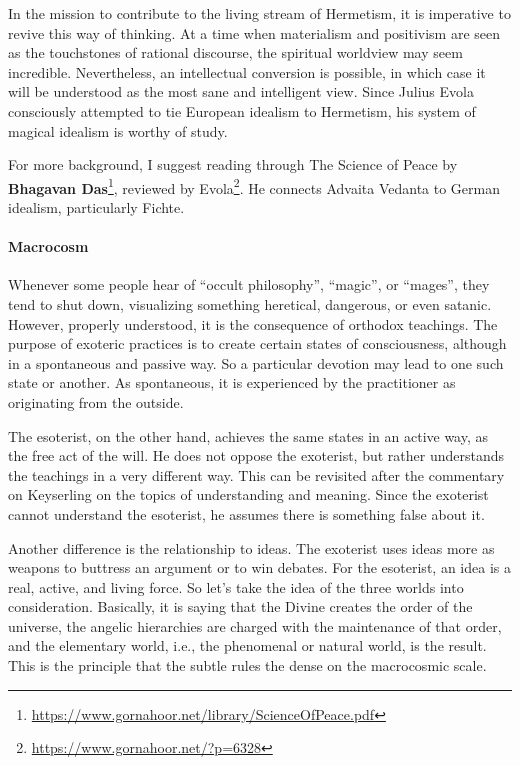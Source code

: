 In the mission to contribute to the living stream of Hermetism, it is imperative to revive this way of thinking. At a time when materialism and positivism are seen as the touchstones of rational discourse, the spiritual worldview may seem incredible. Nevertheless, an intellectual conversion is possible, in which case it will be understood as the most sane and intelligent view. Since Julius Evola consciously attempted to tie European idealism to Hermetism, his system of magical idealism is worthy of study.

For more background, I suggest reading through The Science of Peace by \textbf{Bhagavan Das}\footnote{\url{https://www.gornahoor.net/library/ScienceOfPeace.pdf}}, reviewed by Evola\footnote{\url{https://www.gornahoor.net/?p=6328}}. He connects Advaita Vedanta to German idealism, particularly Fichte.

\paragraph{Macrocosm}
Whenever some people hear of “occult philosophy”, “magic”, or “mages”, they tend to shut down, visualizing something heretical, dangerous, or even satanic. However, properly understood, it is the consequence of orthodox teachings. The purpose of exoteric practices is to create certain states of consciousness, although in a spontaneous and passive way. So a particular devotion may lead to one such state or another. As spontaneous, it is experienced by the practitioner as originating from the outside.

The esoterist, on the other hand, achieves the same states in an active way, as the free act of the will. He does not oppose the exoterist, but rather understands the teachings in a very different way. This can be revisited after the commentary on Keyserling on the topics of understanding and meaning. Since the exoterist cannot understand the esoterist, he assumes there is something false about it.

Another difference is the relationship to ideas. The exoterist uses ideas more as weapons to buttress an argument or to win debates. For the esoterist, an idea is a real, active, and living force. So let’s take the idea of the three worlds into consideration. Basically, it is saying that the Divine creates the order of the universe, the angelic hierarchies are charged with the maintenance of that order, and the elementary world, i.e., the phenomenal or natural world, is the result. This is the principle that the subtle rules the dense on the macrocosmic scale.

